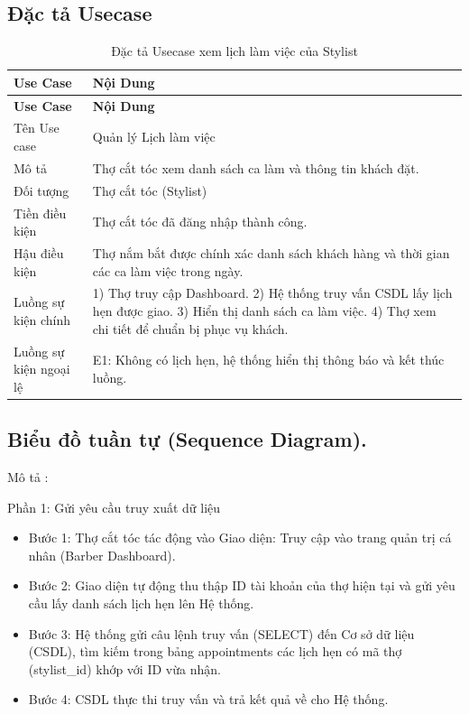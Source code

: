 \documentclass[../BTL.tex]{subfiles}
\begin{document}
\subsection{Đặc tả Usecase}
\begin{longtable}{|p{}|p{}|}
\caption{Đặc tả Usecase xem lịch làm việc của Stylist}\label{tab:usecase-xem-lich-lam-viec}\\
\hline
\textbf{Use Case} & \textbf{Nội Dung} \\
\hline
\endfirsthead
\hline
\textbf{Use Case} & \textbf{Nội Dung} \\
\hline
\endhead
Tên Use case & Quản lý Lịch làm việc \\
\hline
Mô tả & Thợ cắt tóc xem danh sách ca làm và thông tin khách đặt. \\
\hline
Đối tượng & Thợ cắt tóc (Stylist) \\
\hline
Tiền điều kiện & Thợ cắt tóc đã đăng nhập thành công. \\
\hline
Hậu điều kiện & Thợ nắm bắt được chính xác danh sách khách hàng và thời gian các ca làm việc trong ngày. \\
\hline
Luồng sự kiện chính & 1) Thợ truy cập Dashboard. 2) Hệ thống truy vấn CSDL lấy lịch hẹn được giao. 3) Hiển thị danh sách ca làm việc. 4) Thợ xem chi tiết để chuẩn bị phục vụ khách. \\
\hline
Luồng sự kiện ngoại lệ & E1: Không có lịch hẹn, hệ thống hiển thị thông báo và kết thúc luồng. \\
\hline
\end{longtable}

\subsection{Biểu đồ tuần tự (Sequence Diagram).}

Mô tả :

Phần 1: Gửi yêu cầu truy xuất dữ liệu

\begin{itemize}
\item
  Bước 1: Thợ cắt tóc tác động vào Giao diện: Truy cập vào trang quản
  trị cá nhân (Barber Dashboard).
\item
  Bước 2: Giao diện tự động thu thập ID tài khoản của thợ hiện tại và
  gửi yêu cầu lấy danh sách lịch hẹn lên Hệ thống.
\item
  Bước 3: Hệ thống gửi câu lệnh truy vấn (SELECT) đến Cơ sở dữ liệu
  (CSDL), tìm kiếm trong bảng appointments các lịch hẹn có mã thợ
  (stylist\_id) khớp với ID vừa nhận.
\item
  Bước 4: CSDL thực thi truy vấn và trả kết quả về cho Hệ thống.
\end{itemize}
\end{document}
